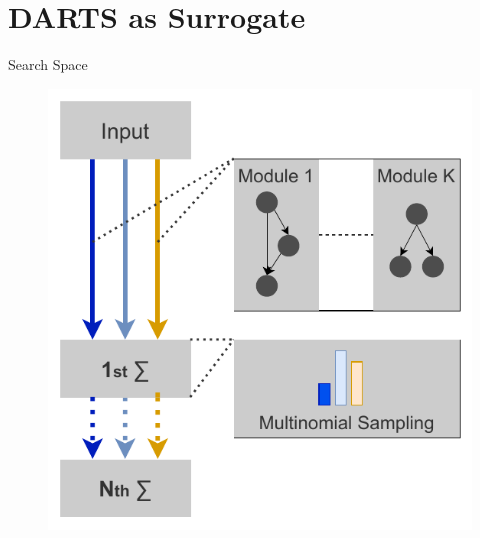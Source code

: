 \documentclass[]{beamer}
\begin{document}
\section{DARTS as Surrogate}
\begin{frame}{Search Space}
\vspace{5pt}
\vfill
\begin{figure}
    \begin{center}
    \includegraphics[scale=.75]{graphics/v3_search_space.pdf}
    \caption{}
  \end{center} 
\end{figure}
\end{frame}
\end{document}
